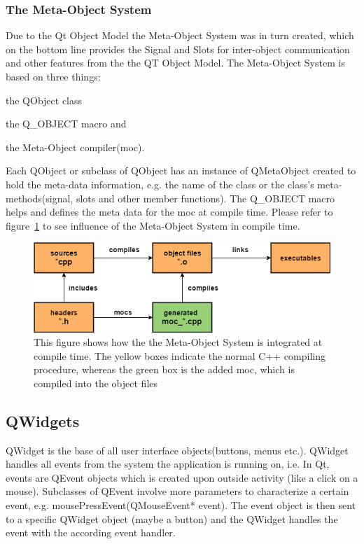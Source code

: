 \subsubsection{The Meta-Object System}
Due to the Qt Object Model the Meta-Object System was in turn created, which on the bottom line provides the Signal and Slots for inter-object communication and other features from the the QT Object Model. The Meta-Object System is based on three things:
\begin{enumerate*}[label={\alph*)},font={\color{red!50!black}\bfseries}]
\item the QObject class
\item the Q\_OBJECT macro and
\item the Meta-Object compiler(moc).
\end{enumerate*}
Each QObject or subclass of QObject has an instance of QMetaObject created to hold the meta-data information, e.g. the name of the class or the class's meta-methods(signal, slots and other member functions). The Q\_OBJECT macro helps and defines the meta data for the moc at compile time. Please refer to figure~\ref{fig:QtC++BuildProcess} to see influence of the Meta-Object System in compile time.

\begin{figure}[h]
	\centering
	\includegraphics[scale=0.55]{Figures/QtC++BuildProcess.png}
	\caption{This figure shows how the the Meta-Object System is integrated at compile time. The yellow boxes indicate the normal C++ compiling procedure, whereas the green box is the added moc, which is compiled into the object files}
	\label{fig:QtC++BuildProcess}
\end{figure}

\subsection{QWidgets}
\label{sec:qwidgets}
QWidget is the base of all user interface objects(buttons, menus etc.). QWidget handles all events from the system the application is running on, i.e. In Qt, events are QEvent objects which is created upon outside activity (like a click on a mouse). Subclasses of QEvent involve more parameters to characterize a certain event, e.g. mousePressEvent(QMouseEvent* event). The event object is then sent to a specific QWidget object (maybe a button) and the QWidget handles the event with the according event handler.\\

